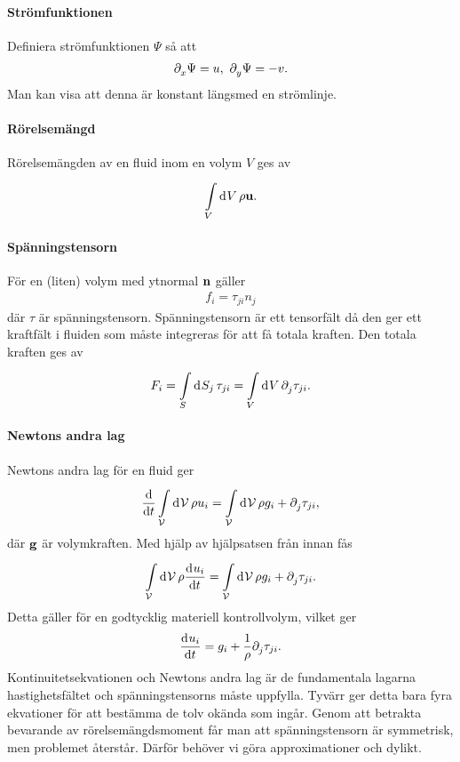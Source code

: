 \paragraph{Strömfunktionen}
Definiera strömfunktionen $\Psi$ så att
\begin{align*}
	\partial_{x}^{}\Psi = u,\ \partial_{y}^{}\Psi = -v.
\end{align*}
Man kan visa att denna är konstant längsmed en strömlinje.

\paragraph{Rörelsemängd}
Rörelsemängden av en fluid inom en volym $V$ ges av
\begin{align*}
	\int\limits_{V}^{}\dd[]{V}\rho\vb{u}.
\end{align*}

\paragraph{Spänningstensorn}
För en (liten) volym med ytnormal $\vb{n}$ gäller
\begin{align*}
	f_{i} = \tau_{ji}n_{j}
\end{align*}
där $\tau$ är spänningstensorn. Spänningstensorn är ett tensorfält då den ger ett kraftfält i fluiden som måste integreras för att få totala kraften. Den totala kraften ges av
\begin{align*}
	F_{i} = \int\limits_{S}^{}\dd[]{S_{j}}\tau_{ji} = \int\limits_{V}^{}\dd[]{V}\partial_{j}^{}\tau_{ji}.
\end{align*}

\paragraph{Newtons andra lag}
Newtons andra lag för en fluid ger
\begin{align*}
	\dv{t}\int\limits_{\mathcal{V}}^{}\dd[]{\mathcal{V}}\rho u_{i} = \int\limits_{\mathcal{V}}^{}\dd[]{\mathcal{V}}\rho g_{i} + \partial_{j}^{}\tau_{ji},
\end{align*}
där $\vb{g}$ är volymkraften. Med hjälp av hjälpsatsen från innan fås
\begin{align*}
	\int\limits_{\mathcal{V}}^{}\dd[]{\mathcal{V}}\rho\dv[]{u_{i}}{t} = \int\limits_{\mathcal{V}}^{}\dd[]{\mathcal{V}}\rho g_{i} + \partial_{j}^{}\tau_{ji}.
\end{align*}
Detta gäller för en godtycklig materiell kontrollvolym, vilket ger
\begin{align*}
	\dv[]{u_{i}}{t} = g_{i} + \frac{1}{\rho}\partial_{j}^{}\tau_{ji}.
\end{align*}
Kontinuitetsekvationen och Newtons andra lag är de fundamentala lagarna hastighetsfältet och spänningstensorns måste uppfylla. Tyvärr ger detta bara fyra ekvationer för att bestämma de tolv okända som ingår. Genom att betrakta bevarande av rörelsemängdsmoment får man att spänningstensorn är symmetrisk, men problemet återstår. Därför behöver vi göra approximationer och dylikt.

